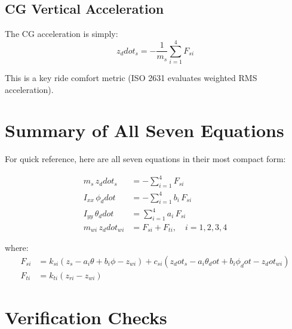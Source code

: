 \documentclass[11pt]{article}
\def\ddot#1{#1_ddot}%
\def\dot#1{#1_dot}%
\begin{document}
\subsection{CG Vertical Acceleration}

The CG acceleration is simply:
\begin{equation}
\ddot{z}_s = -\frac{1}{m_s}\sum_{i=1}^4 F_{si}
\end{equation}

This is a key ride comfort metric (ISO 2631 evaluates weighted RMS acceleration).

\section{Summary of All Seven Equations}

For quick reference, here are all seven equations in their most compact form:

\begin{align}
m_s\,\ddot{z}_s &= -\sum_{i=1}^{4} F_{si}
\tag{Bounce} \\[6pt]
I_{xx}\,\ddot{\phi} &= -\sum_{i=1}^{4} b_i\,F_{si}
\tag{Roll} \\[6pt]
I_{yy}\,\ddot{\theta} &= \sum_{i=1}^{4} a_i\,F_{si}
\tag{Pitch} \\[6pt]
m_{wi}\,\ddot{z}_{wi} &= F_{si} + F_{ti}, \quad i=1,2,3,4
\tag{Wheel $i$}
\end{align}

where:
\begin{align}
F_{si} &= k_{si}(z_s - a_i\theta + b_i\phi - z_{wi}) + c_{si}(\dot{z}_s - a_i\dot\theta + b_i\dot\phi - \dot{z}_{wi}) \\
F_{ti} &= k_{ti}(z_{ri} - z_{wi})
\end{align}

\section{Verification Checks}
\end{document}
